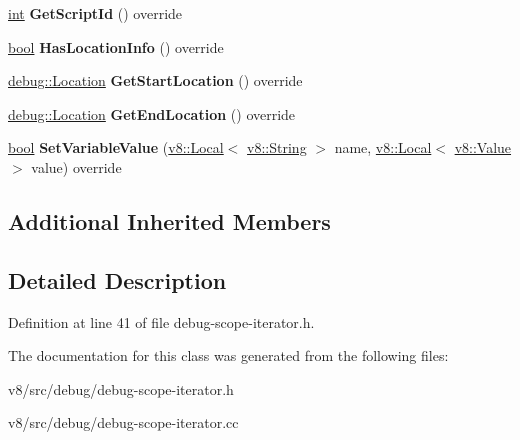 \begin{DoxyCompactItemize}
\mbox{\hyperlink{classint}{int}} {\bfseries Get\+Script\+Id} () override
\item 
\mbox{\label{classv8_1_1internal_1_1DebugWasmScopeIterator_a0621a5f63c485afe0defbc440d25d4e9}} 
\mbox{\hyperlink{classbool}{bool}} {\bfseries Has\+Location\+Info} () override
\item 
\mbox{\label{classv8_1_1internal_1_1DebugWasmScopeIterator_a820254318f83fa6ecdc290e17fb6ee76}} 
\mbox{\hyperlink{classv8_1_1debug_1_1Location}{debug\+::\+Location}} {\bfseries Get\+Start\+Location} () override
\item 
\mbox{\label{classv8_1_1internal_1_1DebugWasmScopeIterator_a7b55c1aa12a64852c8c5531dfbd3dd39}} 
\mbox{\hyperlink{classv8_1_1debug_1_1Location}{debug\+::\+Location}} {\bfseries Get\+End\+Location} () override
\item 
\mbox{\label{classv8_1_1internal_1_1DebugWasmScopeIterator_aa5a19ae8124f30f225f858c841e66286}} 
\mbox{\hyperlink{classbool}{bool}} {\bfseries Set\+Variable\+Value} (\mbox{\hyperlink{classv8_1_1Local}{v8\+::\+Local}}$<$ \mbox{\hyperlink{classv8_1_1String}{v8\+::\+String}} $>$ name, \mbox{\hyperlink{classv8_1_1Local}{v8\+::\+Local}}$<$ \mbox{\hyperlink{classv8_1_1Value}{v8\+::\+Value}} $>$ value) override
\end{DoxyCompactItemize}
\subsection*{Additional Inherited Members}


\subsection{Detailed Description}


Definition at line 41 of file debug-\/scope-\/iterator.\+h.



The documentation for this class was generated from the following files\+:\begin{DoxyCompactItemize}
\item 
v8/src/debug/debug-\/scope-\/iterator.\+h\item 
v8/src/debug/debug-\/scope-\/iterator.\+cc\end{DoxyCompactItemize}
